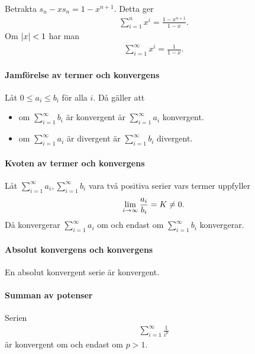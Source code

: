 \proof
Betrakta $s_n - xs_n = 1 - x^{n + 1}$. Detta ger
\begin{align*}
	\sum\limits_{i = 1}^{n}x^i = \frac{1 - x^{n + 1}}{1 - x}.
\end{align*}
Om $\abs{x} < 1$ har man
\begin{align*}
	\sum\limits_{i = 1}^{\infty}x^i = \frac{1}{1 - x}.
\end{align*}

\paragraph{Jamförelse av termer och konvergens}
Låt $0\leq a_i\leq b_i$ för alla $i$. Då gäller att
\begin{itemize}
	\item om $\sum\limits_{i = 1}^{\infty}b_i$ är konvergent är $\sum\limits_{i = 1}^{\infty}a_i$ konvergent.
	\item om $\sum\limits_{i = 1}^{\infty}a_i$ är divergent är $\sum\limits_{i = 1}^{\infty}b_i$ divergent.
\end{itemize}

\proof

\paragraph{Kvoten av termer och konvergens}
Låt $\sum\limits_{i = 1}^{\infty}a_i, \sum\limits_{i = 1}^{\infty}b_i$ vara två positiva serier vars termer uppfyller
\begin{align*}
	\lim\limits_{i\to \infty}\frac{a_i}{b_i} = K\neq 0.
\end{align*}
Då konvergerar $\sum\limits_{i = 1}^{\infty}a_i$ om och endast om $\sum\limits_{i = 1}^{\infty}b_i$ konvergerar.

\proof

\paragraph{Absolut konvergens och konvergens}
En absolut konvergent serie är konvergent.

\proof

\paragraph{Summan av potenser}
Serien
\begin{align*}
	\sum\limits_{i = 1}^{\infty}\frac{1}{i^p}
\end{align*}
är konvergent om och endast om $p > 1$.

\proof